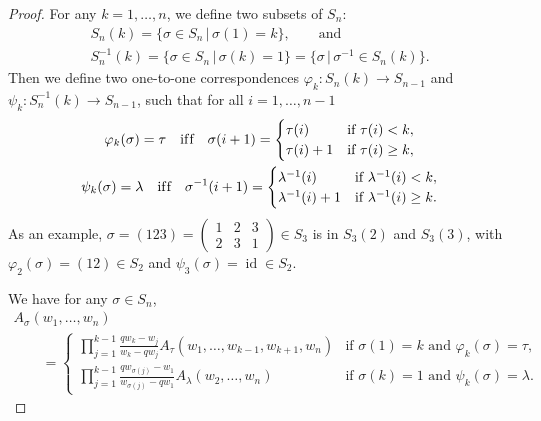 \documentclass[pdftex]{sigma}
\numberwithin{equation}{section}
\DeclareMathOperator{\id}{id}
\begin{document}
\begin{proof}
 For any $k = 1, \dotsc, n$, we def\/ine two subsets of $S_n$:
 \begin{gather}
 S_n(k) = \{ \sigma \in S_n \,|\, \sigma(1) = k \}, \qquad \text{and} \nonumber\\
  S^{-1}_n(k) = \{ \sigma \in S_n \,|\, \sigma(k) = 1 \} = \big\{ \sigma \,|\, \sigma^{-1} \in S_n(k) \big\}.\label{eq:defn_S_n(k)}
 \end{gather}
 Then we def\/ine two one-to-one correspondences $\varphi_k\colon S_n(k) \to S_{n - 1}$ and $\psi_k\colon S^{-1}_n(k) \to S_{n - 1}$, such that
for all $i = 1, \dotsc, n - 1$
 \begin{gather}
 \varphi_k(\sigma) =   \tau \quad \text{if\/f} \quad \sigma(i + 1) =
 \begin{cases}
 \tau(i) & \text{if $\tau(i) < k$}, \\
 \tau(i) + 1 & \text{if $\tau(i) \geq k$},
 \end{cases} \nonumber\\
 \psi_k(\sigma) =   \lambda \quad \text{if\/f} \quad \sigma^{-1}(i + 1) =
 \begin{cases}
 \lambda^{-1}(i) & \text{if $\lambda^{-1}(i) < k$}, \\
 \lambda^{-1}(i) + 1 & \text{if $\lambda^{-1}(i) \geq k$}.
 \end{cases}
\label{eq:defn_varphi_k_and_psi_k}
 \end{gather}
 As an example, $\sigma = (123) = \left(
 \begin{smallmatrix}
 1 & 2 & 3 \\
 2 & 3 & 1
 \end{smallmatrix}
 \right) \in S_3$ is in $S_3(2)$ and $S_3(3)$, with $\varphi_2(\sigma) = (12) \in S_2$ and $\psi_3(\sigma) = \id \in S_2$.


 We have for any $\sigma \in S_n$,
\begin{gather}
 A_{\sigma}(w_1, \dotsc, w_n) \nonumber\\
\qquad{} =
 \begin{cases}
 \displaystyle \prod^{k - 1}_{j = 1} \frac{q w_k - w_j}{w_k - q w_j} A_{\tau}(w_1, \dotsc, w_{ k - 1}, w_{k + 1}, w_n) & \text{if $\sigma(1) = k$ and $\varphi_k(\sigma) = \tau$}, \\
 \displaystyle \prod^{k - 1}_{j = 1} \frac{q w_{\sigma(j)} - w_1}{w_{\sigma(j)} - q w_1} A_{\lambda}(w_2, \dotsc, w_n) & \text{if $\sigma(k) = 1$ and $\psi_k(\sigma) = \lambda$}.
 \end{cases}\label{eq:A_sigma_in_A_tau_A_lambda}
 \end{gather}


\end{proof}
\end{document}
